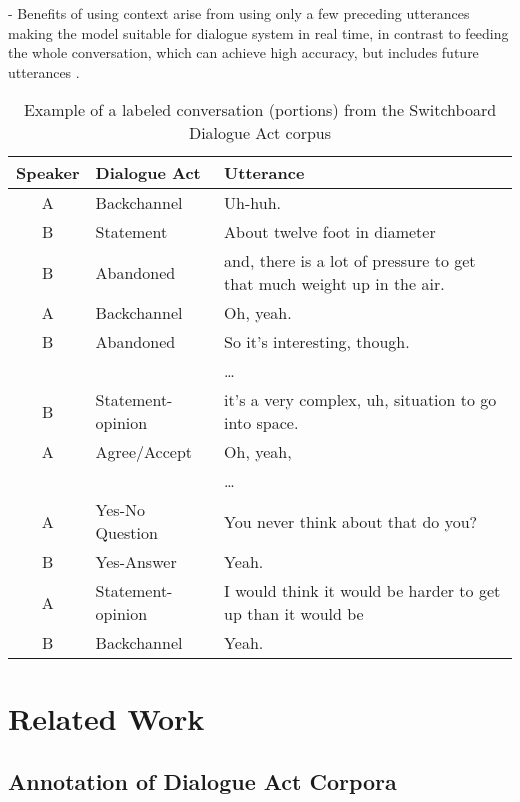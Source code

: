 \documentclass[10pt, a4paper]{article}
\begin{document}
- Benefits of using context arise from using only a few preceding utterances making the model suitable for dialogue system in real time, in contrast to feeding the whole conversation, which can achieve high accuracy, but includes future utterances \cite{ltAl2017EMNLP,kumar2017dasl}.

\begin{table*}[h]
\centering
\caption{Example of a labeled conversation (portions) from the Switchboard Dialogue Act corpus}
\label{sw_example}
\begin{tabular}{cll}
\hline
\textbf{Speaker} & \textbf{Dialogue Act} & \textbf{Utterance} \\ \hline
A                & Backchannel           & Uh-huh.\\
B                & Statement             & About twelve foot in diameter \\
B                & Abandoned             & and, there is a lot of pressure to get that much weight up in the air.\\
A                & Backchannel           & Oh, yeah.\\
B                & Abandoned             & So it's interesting, though.  \\
                 &                       & \ldots  \\
B                & Statement-opinion     & it's a very complex, uh, situation to go into space.\\
A                & Agree/Accept          & Oh, yeah,\\
                 &                       & \ldots  \\
A                & Yes-No Question       & You never think about that do you? \\
B                & Yes-Answer            & Yeah. \\
A                & Statement-opinion     & I would think it would be harder to get up than it would be \\
B                & Backchannel           & Yeah. \\ \hline
\end{tabular}
\end{table*}


\section{Related Work}

\subsection{Annotation of Dialogue Act Corpora}
\end{document}
